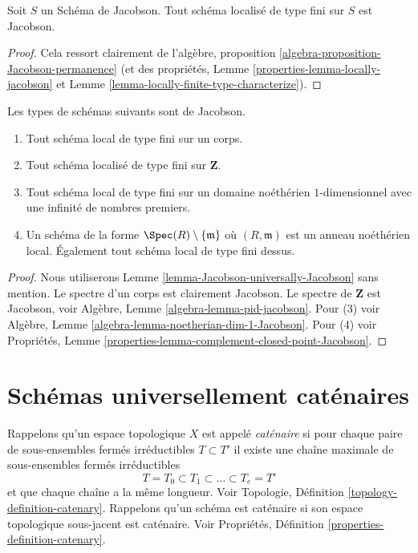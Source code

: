 \begin{lemma}
\label{lemma-Jacobson-universally-Jacobson}
Soit $S$ un Schéma de Jacobson.
Tout schéma localisé de type fini sur $S$ est Jacobson.
\end{lemma}

\begin{proof}
Cela ressort
clairement de l'algèbre, proposition
\ref{algebra-proposition-Jacobson-permanence} (et des propriétés, Lemme \ref{properties-lemma-locally-jacobson}
et Lemme \ref{lemma-locally-finite-type-characterize}).
\end{proof}

\begin{lemma}
\label{lemma-ubiquity-Jacobson-schemes}
Les types de schémas suivants sont de Jacobson.
\begin{enumerate}
\item Tout schéma local de type fini sur un corps.
\item Tout schéma localisé de type fini sur $\mathbf{Z}$.
\item Tout schéma local de type fini sur un domaine noéthérien $1$-dimensionnel
avec une infinité de nombres premiers.
\item Un schéma de la forme $\Spec(R) \setminus \{\mathfrak m\}$ où $(R, \mathfrak m)$
est un anneau noéthérien local. Également tout
schéma local de type fini dessus.
\end{enumerate}
\end{lemma}

\begin{proof}
Nous utiliserons Lemme \ref{lemma-Jacobson-universally-Jacobson} sans mention. Le spectre
d’un corps est clairement
Jacobson. Le spectre de $\mathbf{Z}$
est Jacobson, voir Algèbre,
Lemme
\ref{algebra-lemma-pid-jacobson}. Pour (3) voir Algèbre, Lemme
\ref{algebra-lemma-noetherian-dim-1-Jacobson}.
Pour (4) voir Propriétés, Lemme \ref{properties-lemma-complement-closed-point-Jacobson}.
\end{proof}







\section{Schémas universellement caténaires}
\label{section-universally-catenary}

\noindent
Rappelons qu'un espace topologique $X$ est appelé {\it caténaire}
si pour chaque paire de sous-ensembles fermés irréductibles $T \subset T'$
il existe une chaîne maximale de sous-ensembles fermés irréductibles
$$
T = T_0 \subset T_1 \subset \ldots \subset T_e = T'
$$
et que chaque chaîne a la même longueur.
Voir Topologie, Définition \ref{topology-definition-catenary}. Rappelons
qu'un schéma est caténaire si son espace topologique sous-jacent
est caténaire. Voir Propriétés, Définition \ref{properties-definition-catenary}.

